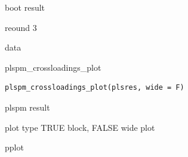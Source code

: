 \documentclass[a4paper]{book}
\begin{document}
%
\begin{Arguments}
\begin{ldescription}
\item[\code{plsres}] boot result

\item[\code{digits}] reound 3
\end{ldescription}
\end{Arguments}
%
\begin{Value}
data
\end{Value}
%
\begin{Description}
plspm\_crossloadings\_plot
\end{Description}
%
\begin{Usage}
\begin{verbatim}
plspm_crossloadings_plot(plsres, wide = F)
\end{verbatim}
\end{Usage}
%
\begin{Arguments}
\begin{ldescription}
\item[\code{plsres}] plspm result

\item[\code{wide}] plot type TRUE block, FALSE wide plot
\end{ldescription}
\end{Arguments}
%
\begin{Value}
pplot
\end{Value}
%
\end{document}
